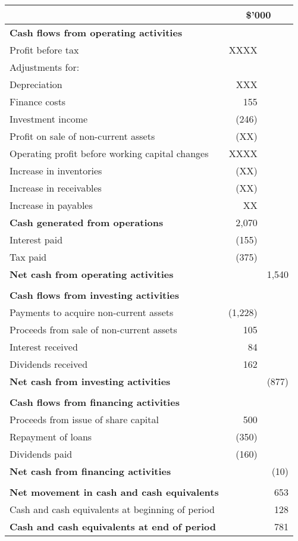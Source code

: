 \begin{tabular}{@{}l r r@{}}
\toprule
 & \multicolumn{2}{c}{\$'000} \\
\midrule
\textbf{Cash flows from operating activities} & & \\
\quad Profit before tax & XXXX & \\
\quad Adjustments for: & & \\
\qquad Depreciation & XXX & \\
\qquad Finance costs & 155 & \\
\qquad Investment income & (246) & \\
\qquad Profit on sale of non-current assets & (XX) & \\
\quad Operating profit before working capital changes & XXXX & \\
\quad Increase in inventories & (XX) & \\
\quad Increase in receivables & (XX) & \\
\quad Increase in payables & XX & \\
\quad \textbf{Cash generated from operations} & 2,070 & \\
\quad Interest paid & (155) & \\
\quad Tax paid & (375) & \\
\textbf{Net cash from operating activities} & & 1,540 \\
\\
\textbf{Cash flows from investing activities} & & \\
\quad Payments to acquire non-current assets & (1,228) & \\
\quad Proceeds from sale of non-current assets & 105 & \\
\quad Interest received & 84 & \\
\quad Dividends received & 162 & \\
\textbf{Net cash from investing activities} & & (877) \\
\\
\textbf{Cash flows from financing activities} & & \\
\quad Proceeds from issue of share capital & 500 & \\
\quad Repayment of loans & (350) & \\
\quad Dividends paid & (160) & \\
\textbf{Net cash from financing activities} & & (10) \\
\\
\textbf{Net movement in cash and cash equivalents} & & 653 \\
Cash and cash equivalents at beginning of period & & 128 \\
\textbf{Cash and cash equivalents at end of period} & & 781 \\
\bottomrule
\end{tabular}
